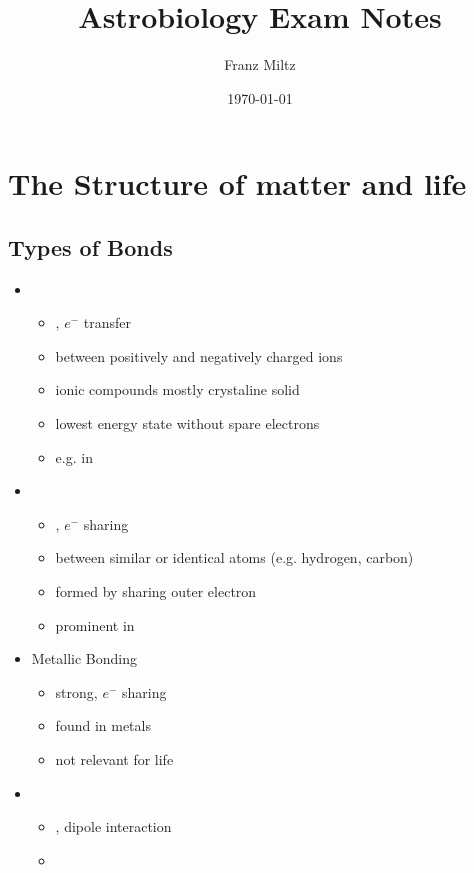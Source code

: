 \documentclass{article}
\title{Astrobiology Exam Notes}
\date{\today}
\author{Franz Miltz}
\theoremstyle{sltheorem}
\begin{document}
\maketitle
\tableofcontents
\pagebreak
\section{The Structure of matter and life}
\subsection{Types of Bonds}
\begin{itemize}
    \item {}
    \begin{itemize}
        \item {}, $e^-$ transfer
        \item between positively and negatively charged ions
        \item ionic compounds mostly crystaline solid
        \item lowest energy state without spare electrons
        \item e.g. in 
    \end{itemize}
    \item {}
    \begin{itemize}
        \item {}, $e^-$ sharing
        \item between similar or identical atoms (e.g. hydrogen, carbon)
        \item formed by sharing outer electron
        \item prominent in 
    \end{itemize}
    \item Metallic Bonding
    \begin{itemize}
        \item strong, $e^-$ sharing
        \item found in metals
        \item not relevant for life
    \end{itemize}
    \item {}
    \begin{itemize}
        \item {}, dipole interaction
        \item {}
        \begin{itemize}

\end{itemize}
\end{itemize}
\end{itemize}
\end{document}
